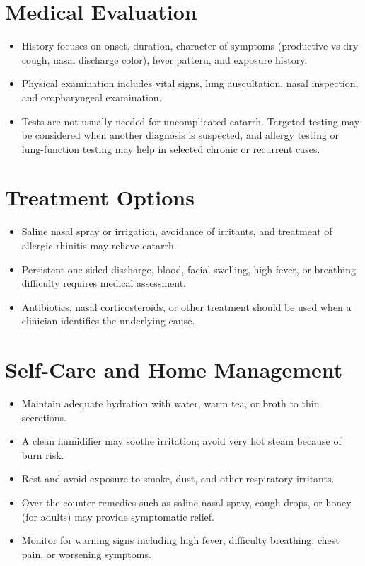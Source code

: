 \section*{Medical Evaluation}
\begin{itemize}
 \item History focuses on onset, duration, character of symptoms (productive vs dry cough, nasal discharge color), fever pattern, and exposure history.
 \item Physical examination includes vital signs, lung auscultation, nasal inspection, and oropharyngeal examination.
 \item Tests are not usually needed for uncomplicated catarrh. Targeted testing may be considered when another diagnosis is suspected, and allergy testing or lung-function testing may help in selected chronic or recurrent cases.
\end{itemize}

\section*{Treatment Options}
\begin{itemize}
  \item Saline nasal spray or irrigation, avoidance of irritants, and treatment of allergic rhinitis may relieve catarrh.
  \item Persistent one-sided discharge, blood, facial swelling, high fever, or breathing difficulty requires medical assessment.
  \item Antibiotics, nasal corticosteroids, or other treatment should be used when a clinician identifies the underlying cause.
\end{itemize}

\section*{Self-Care and Home Management}
\begin{itemize}
 \item Maintain adequate hydration with water, warm tea, or broth to thin secretions.
 \item A clean humidifier may soothe irritation; avoid very hot steam because of burn risk.
 \item Rest and avoid exposure to smoke, dust, and other respiratory irritants.
 \item Over-the-counter remedies such as saline nasal spray, cough drops, or honey (for adults) may provide symptomatic relief.
 \item Monitor for warning signs including high fever, difficulty breathing, chest pain, or worsening symptoms.
\end{itemize}

